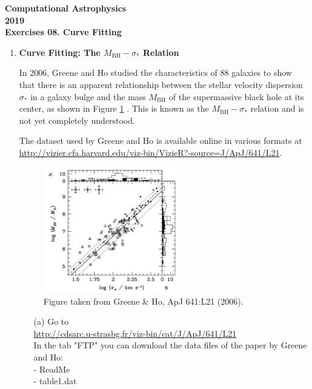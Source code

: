 \documentclass[11pt]{article}
\begin{document}
\begin{center}
\large \bf Computational Astrophysics \rm \\
2019\\
{\small Exercises 08. Curve Fitting}
\end{center}

\begin{enumerate}

\item {\bf Curve Fitting: The $M_\mathrm{BH}-\sigma_*$ Relation }

In 2006, Greene and Ho \cite{Greene} studied the characteristics of 88 galaxies to show that there is an apparent relationship between the stellar velocity dispersion $\sigma_*$ in a galaxy bulge and the mass $M_\mathrm{BH}$ of the supermassive black hole at its
center, as shown in Figure \ref{fig:msigma} . This  is known as 
the $M_\mathrm{BH}-\sigma_*$ relation and is not yet  completely understood. 

The dataset used by Greene and Ho is available
online in various formats at
\url{http://vizier.cfa.harvard.edu/viz-bin/VizieR?-source=J/ApJ/641/L21}.


\vspace*{-0.3cm}
\begin{figure}[h!]
\centering
\includegraphics[width=0.55\textwidth]{msigma.png}
\caption{Figure taken from Greene \& Ho, ApJ 641:L21 (2006).}
\label{fig:msigma}
\end{figure}


\begin{enumerate}
\item[(a)] Go to \\
\url{http://cdsarc.u-strasbg.fr/viz-bin/cat/J/ApJ/641/L21}\\
In the tab "FTP" you can download the data files of the paper by Greene and Ho:\\
- ReadMe\\
- table1.dat\\


\end{enumerate}
\end{enumerate}
\end{document}
